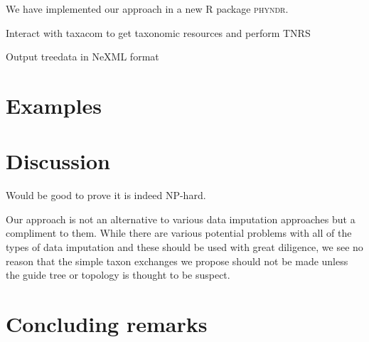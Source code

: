\documentclass[a4paper,11pt]{article}
\begin{document}
We have implemented our approach in a new R package \textsc{phyndr}.

Interact with taxacom to get taxonomic resources and perform TNRS

Output treedata in NeXML format

\section{Examples}

\section{Discussion}

Would be good to prove it is indeed NP-hard.

Our approach is not an alternative to various data imputation approaches but a compliment to them. While there are various potential problems with all of the types of data imputation and these should be used with great diligence, we see no reason that the simple taxon exchanges we propose should not be made unless the guide tree or topology is thought to be suspect.

\section{Concluding remarks}
\end{document}

